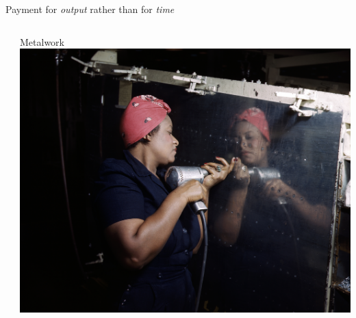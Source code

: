 \documentclass[presentation]{subfiles}
\begin{document}
\begin{frame}[t]{Payment for \emph{output} rather than for \emph{time}}
\begin{columns}[T]
\begin{column}{0.33\textwidth}
    \end{column}
    \begin{column}{0.33\textwidth}
      \centering
      Metalwork\\
      \includegraphics[max width=\linewidth,max height=.3\textheight,keepaspectratio]{../../../presentations/common_figures/photo/Rosie_the_Riveter_(Vultee)_DS.jpg}
    \end{column}
  \end{columns}
  \vspace*{7mm}
  

\end{frame}
\end{document}
